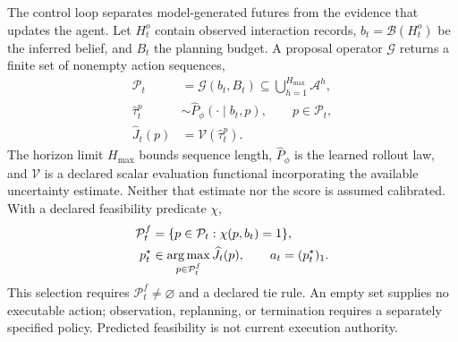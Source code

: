 The control loop separates model-generated futures from the evidence that updates the agent. Let $H_t^o$ contain observed interaction records, $b_t=\mathcal B(H_t^o)$ be the inferred belief, and $B_t$ the planning budget. A proposal operator $\mathcal G$ returns a finite set of nonempty action sequences,
\begin{equation}
\begin{aligned}
 \mathcal P_t&=\mathcal G(b_t,B_t)
 \subseteq\bigcup_{h=1}^{H_{\max}}\mathcal A^h,\\
 \widehat\tau_t^p&\sim\widehat P_\phi(\cdot\mid b_t,p),
 \qquad p\in\mathcal P_t,\\
 \widehat J_t(p)&=\mathcal V(\widehat\tau_t^p).
\end{aligned}
\label{eq:C06:imaginedselection}
\end{equation}
The horizon limit $H_{\max}$ bounds sequence length, $\widehat P_\phi$ is the learned rollout law, and $\mathcal V$ is a declared scalar evaluation functional incorporating the available uncertainty estimate. Neither that estimate nor the score is assumed calibrated. With a declared feasibility predicate $\chi$,
\begin{equation}
\begin{aligned}
 \mathcal P_t^f&=\{p\in\mathcal P_t:\chi(p,b_t)=1\},\\
 p_t^\star&\in\operatorname*{arg\,max}_{p\in\mathcal P_t^f}\widehat J_t(p),
 \qquad a_t=(p_t^\star)_1.
\end{aligned}
\label{eq:C06:feasibleplan}
\end{equation}
This selection requires $\mathcal P_t^f\ne\varnothing$ and a declared tie rule. An empty set supplies no executable action; observation, replanning, or termination requires a separately specified policy. Predicted feasibility is not current execution authority.

